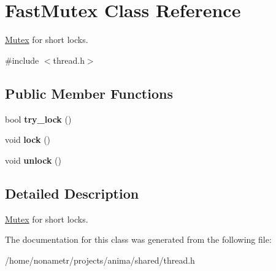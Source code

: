 \hypertarget{classFastMutex}{
\section{FastMutex Class Reference}
\label{classFastMutex}
}


\hyperlink{classMutex}{Mutex} for short locks.  




{\ttfamily \#include $<$thread.h$>$}

\subsection*{Public Member Functions}
\begin{DoxyCompactItemize}
\item 
\hypertarget{classFastMutex_a317934d02531202e55bd185c67bcde41}{
bool {\bfseries try\_\-lock} ()}
\label{classFastMutex_a317934d02531202e55bd185c67bcde41}

\item 
\hypertarget{classFastMutex_a10491d65e4acbe17289fb5f67173ad28}{
void {\bfseries lock} ()}
\label{classFastMutex_a10491d65e4acbe17289fb5f67173ad28}

\item 
\hypertarget{classFastMutex_a46d22576d48f22227db079c1b45e2b48}{
void {\bfseries unlock} ()}
\label{classFastMutex_a46d22576d48f22227db079c1b45e2b48}

\end{DoxyCompactItemize}


\subsection{Detailed Description}
\hyperlink{classMutex}{Mutex} for short locks. 

The documentation for this class was generated from the following file:\begin{DoxyCompactItemize}
\item 
/home/nonametr/projects/anima/shared/thread.h\end{DoxyCompactItemize}

